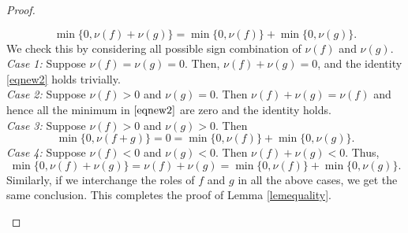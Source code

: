\documentclass[10pt,a4paper]{amsart}
\begin{document}
\begin{proof}
\begin{enumerate}
\begin{equation}
                \min \{ 0,\nu (f)+\nu(g)\}=\min \{ 0,\nu (f)\}+\min \{ 0,\nu (g)\}.
            \end{equation} We check this by considering all possible sign combination of $\nu(f)$ and $\nu(g)$.\\
            \textit{Case 1:} Suppose $\nu(f)=\nu(g)=0$. Then, $\nu(f)+\nu(g)=0$, and the identity \eqref{eqnew2} holds trivially. \\
            \textit{Case 2:} Suppose $\nu(f)>0$ and $\nu(g)=0$. Then $\nu(f)+\nu(g)=\nu(f)$ and hence all the minimum in $\eqref{eqnew2}$ are zero and the identity holds.\\
            \textit{Case 3:} Suppose $\nu(f)>0$ and $\nu(g)>0$. Then 
            \[
            \min \{0, \nu(f+g)\}=0=\min \{0, \nu(f)\}+\min \{0, \nu(g)\}.
            \]
            \textit{Case 4:} Suppose $\nu(f)<0$ and $\nu(g)<0$. Then $\nu(f)+\nu(g)<0$. Thus, 
            \begin{equation*}
                \min \{ 0,\nu(f)+\nu(g)\}= \nu(f)+\nu(g)= \min \{ 0,\nu(f)\}+\min \{0,\nu(g)\}.
            \end{equation*}
             Similarly, if we interchange the roles of $f$ and $g$ in all the above cases, we get the same conclusion. This completes the proof of Lemma \ref{lemequality}.
        \end{enumerate} 
    \end{proof}
\end{document}
